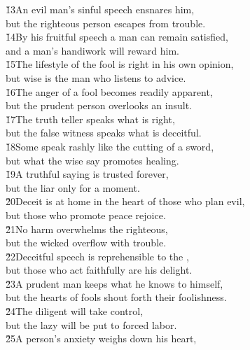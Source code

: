 \begin{poetry}
\poeml \v{13}An evil man's sinful speech ensnares him, \\
\poemll    but the righteous person escapes from trouble. \\
\poeml \v{14}By his fruitful speech a man can remain satisfied, \\
\poemll    and a man's handiwork will reward him. \\
\poeml \v{15}The lifestyle of the fool is right in his own opinion, \\
\poemll    but wise is the man who listens to advice. \\
\poeml \v{16}The anger of a fool becomes readily apparent, \\
\poemll    but the prudent person overlooks an insult. \\
\poeml \v{17}The truth teller speaks what is right, \\
\poemll    but the false witness speaks what is deceitful. \\
\poeml \v{18}Some speak rashly like the cutting of a sword, \\
\poemll    but what the wise say promotes healing. \\
\poeml \v{19}A truthful saying is trusted forever, \\
\poemll    but the liar only for a moment. \\
\poeml \v{20}Deceit is at home in the heart of those who plan evil, \\
\poemll    but those who promote peace rejoice. \\
\poeml \v{21}No harm overwhelms the righteous, \\
\poemll    but the wicked overflow with trouble. \\
\poeml \v{22}Deceitful speech is reprehensible to the , \\
\poemll    but those who act faithfully are his delight. \\
\poeml \v{23}A prudent man keeps what he knows to himself, \\
\poemll    but the hearts of fools shout forth their foolishness. \\
\poeml \v{24}The diligent will take control, \\
\poemll    but the lazy will be put to forced labor. \\
\poeml \v{25}A person's anxiety weighs down his heart, \\

\end{poetry}
